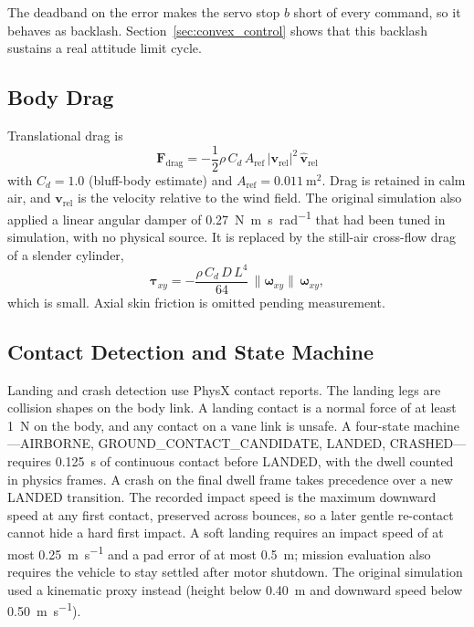 \documentclass[conference]{IEEEtran}
\begin{document}
The deadband on the error makes the servo stop $b$ short of every command, so it behaves as backlash. Section~\ref{sec:convex_control} shows that this backlash sustains a real attitude limit cycle.

\subsection{Body Drag}

Translational drag is
\begin{equation}
\mathbf{F}_{\text{drag}} = -\frac{1}{2} \rho \, C_d \, A_{\text{ref}} \, |\mathbf{v}_{\text{rel}}|^2 \, \hat{\mathbf{v}}_{\text{rel}}
\label{eq:drag}
\end{equation}
with $C_d = 1.0$ (bluff-body estimate) and $A_{\text{ref}} = \SI{0.011}{\metre\squared}$. Drag is retained in calm air, and $\mathbf{v}_{\text{rel}}$ is the velocity relative to the wind field. The original simulation also applied a linear angular damper of \SI{0.27}{\newton\metre\second\per\radian} that had been tuned in simulation, with no physical source. It is replaced by the still-air cross-flow drag of a slender cylinder,
\begin{equation}
\boldsymbol{\tau}_{xy} = -\frac{\rho\,C_d\,D\,L^4}{64}\,\|\boldsymbol{\omega}_{xy}\|\,\boldsymbol{\omega}_{xy},
\label{eq:rot_drag}
\end{equation}
which is small. Axial skin friction is omitted pending measurement.

\subsection{Contact Detection and State Machine}

Landing and crash detection use PhysX contact reports. The landing legs are collision shapes on the body link. A landing contact is a normal force of at least \SI{1}{\newton} on the body, and any contact on a vane link is unsafe. A four-state machine---AIRBORNE, GROUND\_CONTACT\_CANDIDATE, LANDED, CRASHED---requires \SI{0.125}{\second} of continuous contact before LANDED, with the dwell counted in physics frames. A crash on the final dwell frame takes precedence over a new LANDED transition. The recorded impact speed is the maximum downward speed at any first contact, preserved across bounces, so a later gentle re-contact cannot hide a hard first impact. A soft landing requires an impact speed of at most \SI{0.25}{\metre\per\second} and a pad error of at most \SI{0.5}{\metre}; mission evaluation also requires the vehicle to stay settled after motor shutdown. The original simulation used a kinematic proxy instead (height below \SI{0.40}{\metre} and downward speed below \SI{0.50}{\metre\per\second}).
\end{document}
